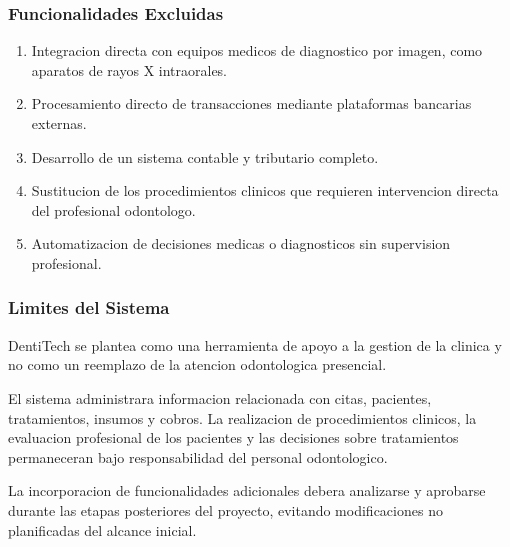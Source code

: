 \subsubsection{Funcionalidades Excluidas}

\begin{enumerate}
    \item Integracion directa con equipos medicos
    de diagnostico por imagen, como aparatos
    de rayos X intraorales.

    \item Procesamiento directo de transacciones
    mediante plataformas bancarias externas.

    \item Desarrollo de un sistema contable
    y tributario completo.

    \item Sustitucion de los procedimientos
    clinicos que requieren intervencion
    directa del profesional odontologo.

    \item Automatizacion de decisiones medicas
    o diagnosticos sin supervision profesional.
\end{enumerate}

\subsubsection{Limites del Sistema}

DentiTech se plantea como una herramienta de apoyo
a la gestion de la clinica y no como un reemplazo
de la atencion odontologica presencial.

El sistema administrara informacion relacionada
con citas, pacientes, tratamientos, insumos y
cobros. La realizacion de procedimientos clinicos,
la evaluacion profesional de los pacientes y las
decisiones sobre tratamientos permaneceran bajo
responsabilidad del personal odontologico.

La incorporacion de funcionalidades adicionales
debera analizarse y aprobarse durante las etapas
posteriores del proyecto, evitando modificaciones
no planificadas del alcance inicial.
